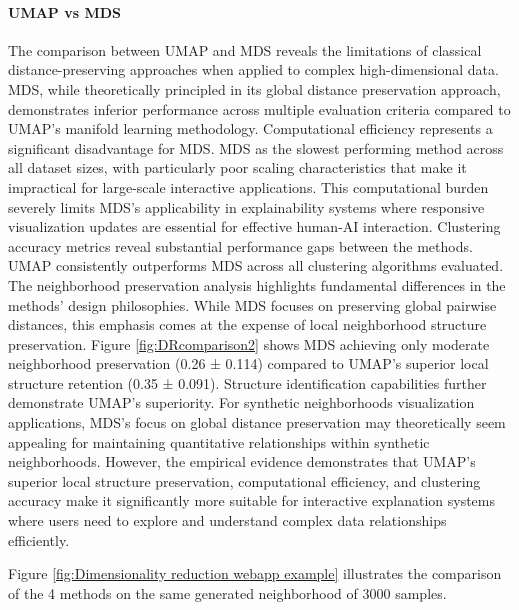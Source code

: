 \paragraph{UMAP vs MDS}
The comparison between UMAP and MDS reveals the limitations of classical distance-preserving approaches when applied to complex high-dimensional data. MDS, while theoretically principled in its global distance preservation approach, demonstrates inferior performance across multiple evaluation criteria compared to UMAP's manifold learning methodology.
Computational efficiency represents a significant disadvantage for MDS. 
MDS as the slowest performing method across all dataset sizes, with particularly poor scaling characteristics that make it impractical for large-scale interactive applications. This computational burden severely limits MDS's applicability in explainability systems where responsive visualization updates are essential for effective human-AI interaction.
Clustering accuracy metrics reveal substantial performance gaps between the methods. UMAP consistently outperforms MDS across all clustering algorithms evaluated.
The neighborhood preservation analysis highlights fundamental differences in the methods' design philosophies. While MDS focuses on preserving global pairwise distances, this emphasis comes at the expense of local neighborhood structure preservation. Figure \ref{fig:DRcomparison2} shows MDS achieving only moderate neighborhood preservation (0.26 ± 0.114) compared to UMAP's superior local structure retention (0.35 ± 0.091).
Structure identification capabilities further demonstrate UMAP's superiority. 
For 
synthetic
neighborhoods visualization applications, MDS's focus on global distance preservation may theoretically seem appealing for maintaining quantitative relationships within synthetic neighborhoods. However, the empirical evidence demonstrates that UMAP's superior local structure preservation, computational efficiency, and clustering accuracy make it significantly more suitable for interactive explanation systems where users need to explore and understand complex data relationships efficiently.

Figure \ref{fig:Dimensionality reduction webapp example} illustrates the comparison of the 4 methods on the same generated neighborhood of 3000 samples.

